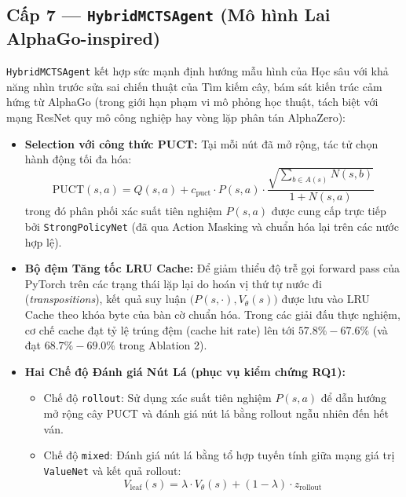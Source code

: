 \documentclass[a4paper,12pt]{report}
\begin{document}
\subsection{Cấp 7 --- \texttt{HybridMCTSAgent} (Mô hình Lai AlphaGo-inspired)}
\texttt{HybridMCTSAgent} kết hợp sức mạnh định hướng mẫu hình của Học sâu với khả năng nhìn trước sửa sai chiến thuật của Tìm kiếm cây, bám sát kiến trúc cảm hứng từ AlphaGo (trong giới hạn phạm vi mô phỏng học thuật, tách biệt với mạng ResNet quy mô công nghiệp hay vòng lặp phân tán AlphaZero):
\begin{itemize}[leftmargin=1.2cm]
    \item \textbf{Selection với công thức PUCT:} Tại mỗi nút đã mở rộng, tác tử chọn hành động tối đa hóa:
    \begin{equation}
        \text{PUCT}(s, a) = Q(s, a) + c_{\text{puct}} \cdot P(s, a) \cdot \frac{\sqrt{\sum_{b \in A(s)} N(s, b)}}{1 + N(s, a)}
    \end{equation}
    trong đó phân phối xác suất tiên nghiệm $P(s, a)$ được cung cấp trực tiếp bởi \texttt{StrongPolicyNet} (đã qua Action Masking và chuẩn hóa lại trên các nước hợp lệ).
    \item \textbf{Bộ đệm Tăng tốc LRU Cache:} Để giảm thiểu độ trễ gọi forward pass của PyTorch trên các trạng thái lặp lại do hoán vị thứ tự nước đi (\textit{transpositions}), kết quả suy luận $\big(P(s, \cdot), V_\theta(s)\big)$ được lưu vào LRU Cache theo khóa byte của bàn cờ chuẩn hóa. Trong các giải đấu thực nghiệm, cơ chế cache đạt tỷ lệ trúng đệm (cache hit rate) lên tới $57.8\% - 67.6\%$ (và đạt $68.7\% - 69.0\%$ trong Ablation 2).
    \item \textbf{Hai Chế độ Đánh giá Nút Lá (phục vụ kiểm chứng RQ1):}
    \begin{itemize}
        \item Chế độ \texttt{rollout}: Sử dụng xác suất tiên nghiệm $P(s, a)$ để dẫn hướng mở rộng cây PUCT và đánh giá nút lá bằng rollout ngẫu nhiên đến hết ván.
        \item Chế độ \texttt{mixed}: Đánh giá nút lá bằng tổ hợp tuyến tính giữa mạng giá trị \texttt{ValueNet} và kết quả rollout:
        \begin{equation}
            V_{\text{leaf}}(s) = \lambda \cdot V_\theta(s) + (1 - \lambda) \cdot z_{\text{rollout}}
        \end{equation}
    \end{itemize}
\end{itemize}

\clearpage
\end{document}
